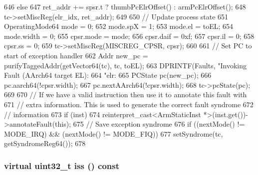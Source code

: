 \begin{DoxyCode}
{646     else
647         ret_addr += spsr.t ? thumbPcElrOffset() : armPcElrOffset();
648     tc->setMiscReg(elr_idx, ret_addr);
649 
650     // Update process state
651     OperatingMode64 mode = 0;
652     mode.spX = 1;
653     mode.el = toEL;
654     mode.width = 0;
655     cpsr.mode = mode;
656     cpsr.daif = 0xf;
657     cpsr.il = 0;
658     cpsr.ss = 0;
659     tc->setMiscReg(MISCREG_CPSR, cpsr);
660 
661     // Set PC to start of exception handler
662     Addr new_pc = purifyTaggedAddr(getVector64(tc), tc, toEL);
663     DPRINTF(Faults, "Invoking Fault (AArch64 target EL):%
664             "elr:%
665     PCState pc(new_pc);
666     pc.aarch64(!cpsr.width);
667     pc.nextAArch64(!cpsr.width);
668     tc->pcState(pc);
669 
670     // If we have a valid instruction then use it to annotate this fault with
671     // extra information. This is used to generate the correct fault syndrome
672     // information
673     if (inst)
674         reinterpret_cast<ArmStaticInst *>(inst.get())->annotateFault(this);
675     // Save exception syndrome
676     if ((nextMode() != MODE_IRQ) && (nextMode() != MODE_FIQ))
677         setSyndrome(tc, getSyndromeReg64());
678 }
\end{DoxyCode}
\hypertarget{classArmISA_1_1ArmFault_a12a2298da9af24c62275dac1cf76a888}{
\subsubsection[{iss}]{\setlength{\rightskip}{0pt plus 5cm}virtual {\bf uint32\_\-t} iss () const}}
\label{classArmISA_1_1ArmFault_a12a2298da9af24c62275dac1cf76a888}


